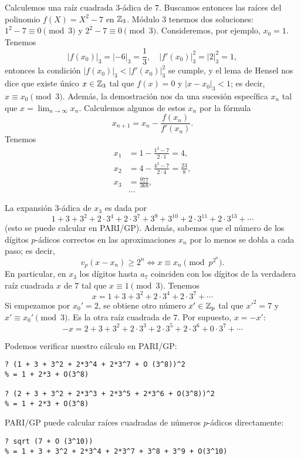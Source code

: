 \documentclass{article}
\numberwithin{equation}{section}
\theoremstyle{definition}
\begin{document}
\begin{ejemplo}
  \label{ejemplo:raiz-cuadrada-3-adica-de-7}
  Calculemos una raíz cuadrada $3$-ádica de $7$. Buscamos entonces las raíces
  del polinomio $f (X) = X^2 - 7$ en $\mathbb{Z}_3$. Módulo $3$ tenemos dos soluciones:
  $1^2 - 7 \equiv 0 \pmod{3}$ y $2^2 - 7 \equiv 0 \pmod{3}$. Consideremos, por
  ejemplo, $x_0 = 1$. Tenemos
  $$|f (x_0)|_3 = |-6|_3 = \frac{1}{3}, \quad |f' (x_0)|_3^2 = |2|_3^2 = 1,$$
  entonces la condición $|f (x_0)|_3 < |f' (x_0)|_3^2$ se cumple, y el lema de
  Hensel nos dice que existe único $x \in \mathbb{Z}_3$ tal que $f (x) = 0$ y
  $|x - x_0|_3 < 1$; es decir, $x \equiv x_0 \pmod{3}$. Además, la demostración
  nos da una sucesión específica $x_n$ tal que $x = \lim_{n\to\infty}
  x_n$. Calculemos algunos de estos $x_n$ por la fórmula
  $$x_{n+1} = x_n - \frac{f (x_n)}{f' (x_n)}.$$
  Tenemos
  \begin{align*}
    x_1 & = 1 - \frac{1^2 - 7}{2\cdot 1} = 4,\\
    x_2 & = 4 - \frac{4^2 - 7}{2\cdot 4} = \frac{23}{8},\\
    x_3 & = \frac{977}{368},\\
        & \ldots
  \end{align*}

  La expansión $3$-ádica de $x_3$ es dada por
  $$1 + 3 + 3^2 + 2\cdot 3^4 + 2\cdot 3^7 + 3^9 + 3^{10} + 2\cdot 3^{11} + 2\cdot 3^{13} + \cdots$$
  (esto se puede calcular en PARI/GP). Además, sabemos que el número de los
  dígitos $p$-ádicos correctos en las aproximaciones $x_n$ por lo menos se dobla
  a cada paso; es decir,
  $$v_p (x-x_n) \ge 2^n \iff x \equiv x_n \pmod{p^{2^n}}.$$
  En particular, en $x_3$ los dígitos hasta $a_7$ coinciden con los dígitos de
  la verdadera raíz cuadrada $x$ de $7$ tal que $x \equiv 1 \pmod{3}$. Tenemos
  $$x = 1 + 3 + 3^2 + 2\cdot 3^4 + 2\cdot 3^7 + \cdots$$
  Si empezamos por $x_0' = 2$, se obtiene otro número $x' \in \mathbb{Z}_p$ tal que
  $x'^2 = 7$ y $x' \equiv x_0' \pmod{3}$. Es la otra raíz cuadrada de $7$. Por
  supuesto, $x = -x'$:
  $$-x = 2 + 3 + 3^2 + 2\cdot 3^3 + 2\cdot 3^5 + 2\cdot 3^6 + 0\cdot 3^7 + \cdots$$

  \begin{framed}
    \noindent Podemos verificar nuestro cálculo en PARI/GP:

    {\small
\begin{verbatim}
? (1 + 3 + 3^2 + 2*3^4 + 2*3^7 + O (3^8))^2
% = 1 + 2*3 + O(3^8)

? (2 + 3 + 3^2 + 2*3^3 + 2*3^5 + 2*3^6 + O(3^8))^2
% = 1 + 2*3 + O(3^8)
\end{verbatim}}

      \noindent PARI/GP puede calcular raíces cuadradas de números $p$-ádicos directamente:

      {\small
\begin{verbatim}
? sqrt (7 + O (3^10))
% = 1 + 3 + 3^2 + 2*3^4 + 2*3^7 + 3^8 + 3^9 + O(3^10)
\end{verbatim}}
      \end{framed}
\end{ejemplo}
\end{document}
